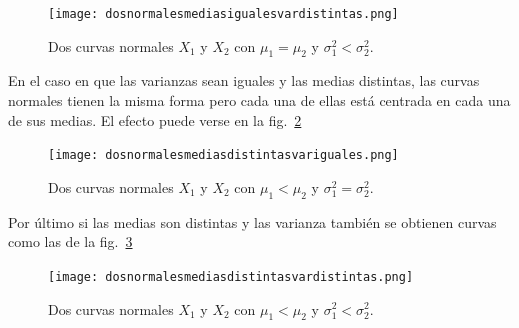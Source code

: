\begin{frame}
 
 \begin{center}
\begin{figure}[htbp]
	\texttt{[image: dosnormalesmediasigualesvardistintas.png]}
	\caption{Dos curvas normales $X_1$ y $X_2$ con $\mu_1=\mu_2$ y $\sigma_1^2<\sigma_2^2$.}
	\label{dosnormalesmediasigualesvardistintas}
\end{figure}
\end{center}
\end{frame}

\begin{frame}

En el caso en que las varianzas sean iguales y las medias distintas, las curvas normales tienen la misma forma pero cada una de ellas está centrada en cada una de sus medias. El efecto puede verse en la fig.~\ref{dosnormalesmediasdistintasvariguales}



\begin{center}
\begin{figure}[htbp]
	\texttt{[image: dosnormalesmediasdistintasvariguales.png]}
	\caption{Dos curvas normales $X_1$ y $X_2$ con $\mu_1<\mu_2$ y $\sigma_1^2=\sigma_2^2$.}
	\label{dosnormalesmediasdistintasvariguales}
\end{figure}
\end{center}
\end{frame}
\begin{frame}
Por último si las medias son distintas y las varianza también se obtienen curvas como las de la fig.~\ref{dosnormalesmediasdistintasvardistintas}

 \begin{center}
\begin{figure}[htbp]
	\texttt{[image: dosnormalesmediasdistintasvardistintas.png]}
	\caption{Dos curvas normales $X_1$ y $X_2$ con $\mu_1<\mu_2$ y $\sigma_1^2<\sigma_2^2$.}
	\label{dosnormalesmediasdistintasvardistintas}
\end{figure}
\end{center}
\end{frame}





